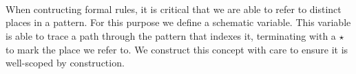 \begin{code}
\>[13]\AgdaSymbol{=}%
\>[16]\<%
\\
\>[0]\AgdaSpace{}%
\AgdaSymbol{(}\AgdaSpace{}%
\AgdaSpace{}%
\AgdaSymbol{)}\AgdaSpace{}%
\AgdaSymbol{(}\AgdaSpace{}%
\AgdaSpace{}%
\AgdaSymbol{)}%
\>[24]\AgdaSymbol{=}%
\>[717I]\<%
\\
\>[717I][@{}l@{\AgdaIndent{0}}]%
\>[28]\AgdaSpace{}%
\AgdaSpace{}%
\AgdaSpace{}%
\AgdaSpace{}%
\<%
\\
%
\>[28]\AgdaSpace{}%
\AgdaSpace{}%
\AgdaSpace{}%
\AgdaSpace{}%
\<%
\\
%
\>[28]\AgdaSpace{}%
\AgdaSymbol{(}\AgdaSpace{}%
\AgdaSpace{}%
\AgdaSymbol{)}\<%
\\
\>[0]\AgdaSpace{}%
\AgdaSymbol{(}\AgdaSpace{}%
\AgdaSymbol{)}\AgdaSpace{}%
\AgdaSymbol{(}\AgdaSpace{}%
\AgdaSymbol{)}\AgdaSpace{}%
\AgdaSymbol{=}%
\>[734I]\<%
\\
\>[734I][@{}l@{\AgdaIndent{0}}]%
\>[28]\AgdaSpace{}%
\AgdaSpace{}%
\AgdaSpace{}%
\AgdaSpace{}%
\<%
\\
%
\>[28]\AgdaSpace{}%
\AgdaSymbol{(}\AgdaSpace{}%
\AgdaSymbol{)}\<%
\\
\>[0]\AgdaSpace{}%
\AgdaCatchallClause{\AgdaSymbol{\AgdaUnderscore{}}}\AgdaSpace{}%
\AgdaCatchallClause{\AgdaSymbol{\AgdaUnderscore{}}}%
\>[28]\AgdaSymbol{=}\AgdaSpace{}%
\<%
\end{code}

When contructing formal rules, it is critical that we are able to refer
to distinct places in a pattern. For this purpose we define a schematic
variable. This variable is able to trace a path through the pattern that
indexes it, terminating with a $⋆$ to mark the place we refer to. We
construct this concept with care to ensure it is well-scoped by construction.

